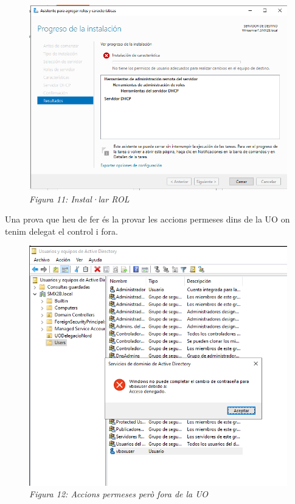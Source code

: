 \documentclass[
  a4paper,
]{article}
\begin{document}
\begin{figure}
\centering
\includegraphics{png/InstalarRolNO.png}
\caption{\emph{Figura 11: Instal·lar ROL}}
\end{figure}

Una prova que heu de fer és la provar les accions permeses dins de la UO
on tenim delegat el control i fora.

\begin{figure}
\centering
\includegraphics{png/NoTienePrivilegios.png}
\caption{\emph{Figura 12: Accions permeses però fora de la UO}}
\end{figure}
\end{document}
